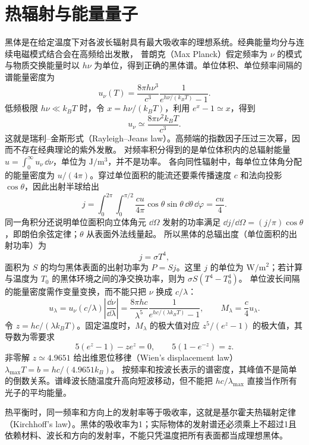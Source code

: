 \section{热辐射与能量量子}

黑体是在给定温度下对各波长辐射具有最大吸收率的理想系统。经典能量均分与连续电磁模式结合会在高频给出发散，
普朗克（Max Planck）假定频率为 $\nu$ 的模式与物质交换能量时以 $h\nu$ 为单位，得到正确的黑体谱。单位体积、单位频率间隔的谱能量密度为
\begin{equation}
 u_\nu(T)=\frac{8\pi h\nu^3}{c^3}\frac1{e^{h\nu/(k_BT)}-1}.
\end{equation}
低频极限 $h\nu\ll k_BT$ 时，令 $x=h\nu/(k_BT)$，利用 $e^x-1\simeq x$，得到
\[
 u_\nu\simeq\frac{8\pi\nu^2k_BT}{c^3}.
\]
这就是瑞利--金斯形式（Rayleigh--Jeans law）。高频端的指数因子压过三次幂，因而不存在经典理论的紫外发散。
对频率积分得到的是单位体积内的总辐射能量 $u=\int_0^\infty u_\nu\,\dd\nu$，单位为 $\mathrm{J/m^3}$，并不是功率。
各向同性辐射中，每单位立体角分配的能量密度为 $u/(4\pi)$。穿过单位面积的能流还要乘传播速度 $c$ 和法向投影 $\cos\theta$，因此出射半球给出
\[
 j=\int_0^{2\pi}\!\int_0^{\pi/2}\frac{cu}{4\pi}\cos\theta\sin\theta\,\dd\theta\,\dd\varphi
 =\frac{cu}{4}.
\]
同一角积分还说明单位面积向立体角元 $\dd\Omega$ 发射的功率满足 $\dd j/\dd\Omega=(j/\pi)\cos\theta$，即朗伯余弦定律；$\theta$ 从表面外法线量起。
所以黑体的总辐出度（单位面积的出射功率）为
\begin{equation}
 j=\sigma T^4,
\end{equation}
面积为 $S$ 的均匀黑体表面的出射功率为 $P=Sj$。这里 $j$ 的单位为 $\mathrm{W/m^2}$；若计算与温度为 $T_0$ 的黑体环境之间的净交换功率，则为 $\sigma S(T^4-T_0^4)$。
单位波长间隔的能量密度需作变量变换，而不能只把 $\nu$ 换成 $c/\lambda$：
\[
 u_\lambda=u_\nu(c/\lambda)\left|\frac{\dd\nu}{\dd\lambda}\right|
 =\frac{8\pi hc}{\lambda^5}\frac1{e^{hc/(\lambda k_BT)}-1},\qquad M_\lambda=\frac c4u_\lambda.
\]
令 $z=hc/(\lambda k_BT)$。固定温度时，$M_\lambda$ 的极大值对应 $z^5/(e^z-1)$ 的极大值，其导数为零要求
\[
 5(e^z-1)-ze^z=0,\qquad 5(1-e^{-z})=z.
\]
非零解 $z\simeq4.9651$ 给出维恩位移律（Wien's displacement law）$\lambda_{\max}T=b=hc/(4.9651k_B)$。
按频率和按波长表示的谱密度，其峰值不是简单的倒数关系。谱峰波长随温度升高向短波移动，但不能把
$hc/\lambda_{\max}$ 直接当作所有光子的平均能量。

热平衡时，同一频率和方向上的发射率等于吸收率，这就是基尔霍夫热辐射定律（Kirchhoff's law）。黑体的吸收率为1；实际物体的发射谱还必须乘上不超过1且依赖材料、波长和方向的发射率，不能只凭温度把所有表面都当成理想黑体。


